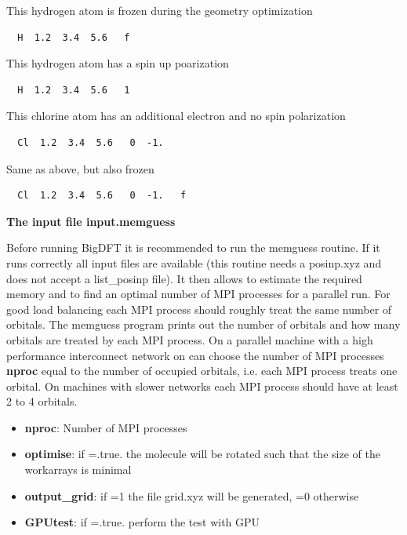 \documentclass[a4paper,11pt]{report}
\begin{document}
This hydrogen atom is frozen during the geometry optimization
\begin{verbatim}
  H  1.2  3.4  5.6   f
\end{verbatim}

This hydrogen atom has a spin up poarization
\begin{verbatim}
  H  1.2  3.4  5.6   1
\end{verbatim}

This chlorine atom has an additional electron and no spin polarization
\begin{verbatim}
  Cl  1.2  3.4  5.6   0  -1.
\end{verbatim}

Same as above, but also frozen
\begin{verbatim}
  Cl  1.2  3.4  5.6   0  -1.   f
\end{verbatim}

\pagebreak
\begin{center} \large
{ \bf The input file input.memguess}
\end{center}
Before running BigDFT it is recommended to run the memguess routine. If it runs correctly all input files are available 
(this routine needs a posinp.xyz and does not accept a list\_posinp file). It then allows to estimate the required memory and to 
find an optimal number of MPI processes for a parallel run. For good load balancing each MPI process should roughly treat the same number 
of orbitals. The memguess program prints out the number of orbitals and how many orbitals are treated by each MPI process. 
On a parallel machine with a high performance interconnect network on can choose the number of MPI processes {\bf nproc} equal 
to the number of occupied orbitals, i.e. each MPI process treats one orbital. On machines with slower networks each MPI process should 
have at least 2 to 4 orbitals. 
\begin{itemize}
\item {\bf nproc}: Number of MPI processes
\item {\bf optimise}: if =.true. the molecule will be rotated such that the size of the workarrays is minimal
\item {\bf output\_grid}: if =1 the file grid.xyz will be generated, =0 otherwise
\item {\bf GPUtest}: if =.true. perform the test with GPU
\end{itemize}
\end{document}
